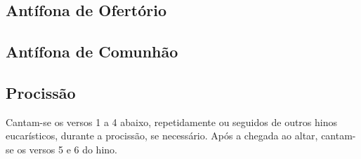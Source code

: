 \AllowPageFlush

\subsection{Antífona de Ofertório}\label{subsection:tempus-per-annum/sanctissimi-corporis-et-sanguinis-christi/offertorium}

\AllowPageFlush

\subsection{Antífona de Comunhão}\label{subsection:tempus-per-annum/sanctissimi-corporis-et-sanguinis-christi/communio}

\subsection{Procissão}\label{subsection:tempus-per-annum/sanctissimi-corporis-et-sanguinis-christi/ad-processionem}
\begin{rubrica}
  Cantam-se os versos 1 a 4 abaixo, repetidamente ou seguidos de outros hinos eucarísticos, durante a procissão, se necessário. Após a chegada ao altar, cantam-se os versos 5 e 6 do hino.
\end{rubrica}
